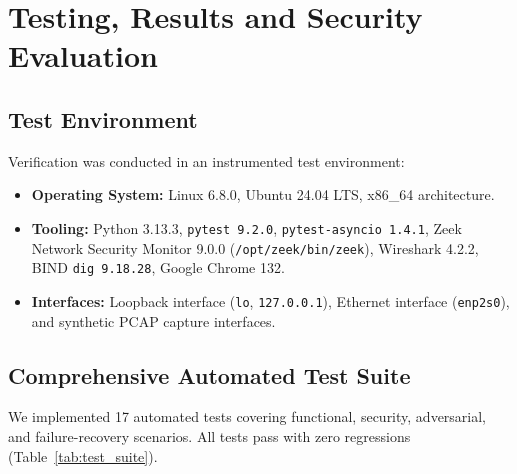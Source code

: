 \documentclass[10pt,a4paper]{article}
\begin{document}
\section{Testing, Results and Security Evaluation}

\subsection{Test Environment}
Verification was conducted in an instrumented test environment:
\begin{itemize}\itemsep 1pt
    \item \textbf{Operating System:} Linux 6.8.0, Ubuntu 24.04 LTS, x86\_64 architecture.
    \item \textbf{Tooling:} Python 3.13.3, \texttt{pytest 9.2.0}, \texttt{pytest-asyncio 1.4.1}, Zeek Network Security Monitor 9.0.0 (\texttt{/opt/zeek/bin/zeek}), Wireshark 4.2.2, BIND \texttt{dig 9.18.28}, Google Chrome 132.
    \item \textbf{Interfaces:} Loopback interface (\texttt{lo}, \texttt{127.0.0.1}), Ethernet interface (\texttt{enp2s0}), and synthetic PCAP capture interfaces.
\end{itemize}

\subsection{Comprehensive Automated Test Suite}
We implemented 17 automated tests covering functional, security, adversarial, and failure-recovery scenarios. All tests pass with zero regressions (Table~\ref{tab:test_suite}).
\end{document}
